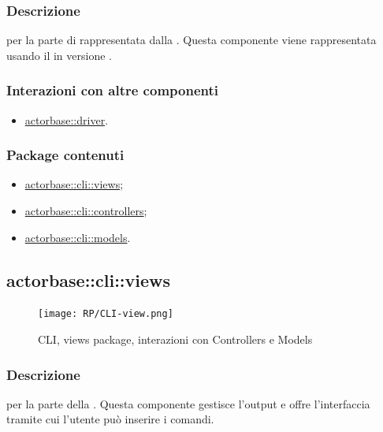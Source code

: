 \documentclass{scalatekids-article}
\begin{document}
\subsubsection{Descrizione}
 per la parte di  rappresentata dalla .
Questa componente viene rappresentata usando il 
 in versione .

\subsubsection{Interazioni con altre componenti}
\begin{itemize}
\item \hyperref[sec:actorbase::driver]{actorbase::driver}.
\end{itemize}

\subsubsection{Package contenuti}
\begin{itemize}
\item \hyperref[sec:actorbase::cli::views]{actorbase::cli::views};
\item \hyperref[sec:actorbase::cli::controllers]{actorbase::cli::controllers};
\item \hyperref[sec:actorbase::cli::models]{actorbase::cli::models}.
\end{itemize}

\subsection{actorbase::cli::views}
\label{sec:actorbase::cli::views}

\begin{figure}[H]
  \begin{center}
    \texttt{[image: RP/CLI-view.png]}
    \caption{CLI, views package, interazioni con Controllers e Models}
  \end{center}
\end{figure}

\subsubsection{Descrizione}

 per la parte  della . Questa componente
gestisce l'output e offre l'interfaccia tramite cui l'utente può inserire i
comandi.
\end{document}
